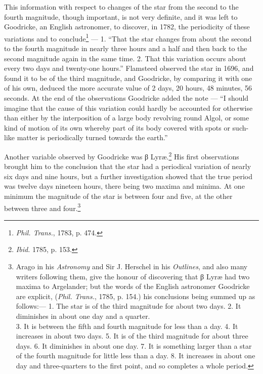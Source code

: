 \documentclass[a4paper, 12pt, oneside, polutonikogreek, english]{article}
\begin{document}
This information with respect to changes of the star from the second to the fourth magnitude, though important, is not very definite, and it was left to Goodricke, an English astronomer, to discover, in 1782, the periodicity of these variations and to conclude\footnote{\emph{Phil. Trans.}, 1783, p. 474.} --- 1. ``That the star changes from about the second to the fourth magnitude in nearly three hours and a half and then back to the second magnitude again in the same time. 2. That this variation occurs about every two days and twenty-one hours.'' Flamsteed observed the star in 1696, and found it to be of the third magnitude, and Goodricke, by comparing it with one of his own, deduced the more accurate value of 2 days, 20 hours, 48 minutes, 56 seconds. At the end of the observations Goodricke added the note --- ``I should imagine that the cause of this variation could hardly be accounted for otherwise than either by the interposition of a large body revolving round Algol, or some kind of motion of its own whereby part of its body covered with spots or such-like matter is periodically turned towards the earth.''

Another variable observed by Goodricke was β Lyræ.\footnote{\emph{Ibid.} 1785, p. 153.} His first observations brought him to the conclusion that the star had a periodical variation of nearly six days and nine hours, but a further investigation showed that the true period was twelve days nineteen hours, there being two maxima and minima. At one minimum the magnitude of the star is between four and five, at the other between three and four.\footnote{Arago in his \emph{Astronomy} and Sir J. Herschel in his \emph{Outlines}, and also many writers following them, give the honour of discovering that β Lyræ had two maxima to Argelander; but the words of the English astronomer Goodricke are explicit, (\emph{Phil. Trans.}, 1785, p. 154.) his conclusions being summed up as follows:--- 1. The star is of the third magnitude for about two days. 2. It diminishes in about one day and a quarter.\\ 3. It is between the fifth and fourth magnitude for less than a day. 4. It increases in about two days. 5. It is of the third magnitude for about three days. 6. It diminishes in about one day. 7. It is something larger than a star of the fourth magnitude for little less than a day. 8. It increases in about one day and three-quarters to the first point, and so completes a whole period.}
\end{document}
